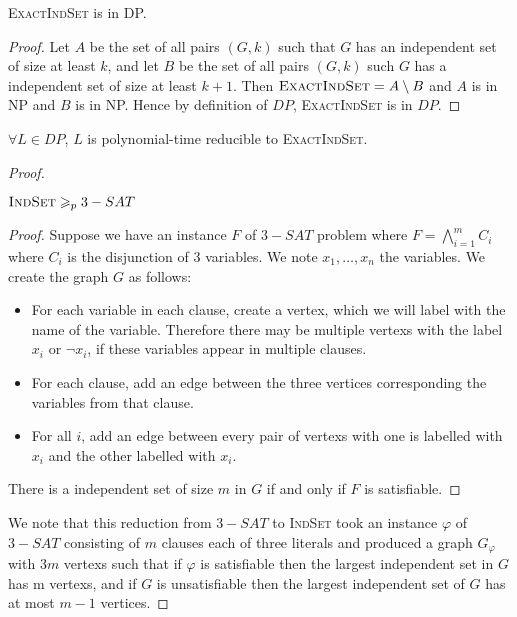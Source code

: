 \begin{propo}\label{3:1}
    \textsc{ExactIndSet} is in DP.
\end{propo}
\begin{proof}
    Let $A$ be the set of all pairs $(G, k)$ such that $G$ has an independent set of size at least $k$, and let $B$ be the set of all pairs $(G, k)$ such $G$ has a independent set of size at least $k+1$. Then $\textsc{ExactIndSet}=A \setminus B$ and $A$ is in NP and $B$ is in NP. Hence by definition of $DP$, \textsc{ExactIndSet} is in $DP$.
\end{proof}

\begin{propo}\label{3:2}
    $\forall L \in DP$, $L$ is polynomial-time reducible to \textsc{ExactIndSet}.
\end{propo}
\begin{proof}
    \begin{lemma}
        $\textsc{IndSet} \geqslant_p 3-SAT$
    \end{lemma}
    \begin{proof}
        Suppose we have an instance $F$ of $3-SAT$ problem where $F=\bigwedge\limits_{i=1}^m C_i$ where $C_i$ is the disjunction of 3 variables. We note $x_1,\ldots,x_n$ the variables. We create the graph $G$ as follows:
        \begin{itemize}
            \item For each variable in each clause, create a vertex, which we will label with the name of the variable. Therefore there may be multiple vertexs with the label $x_i$ or $\neg x_i$, if these variables appear in multiple clauses.
            \item For each clause, add an edge between the three vertices corresponding the variables from that clause.
            \item For all $i$, add an edge between every pair of vertexs with one is labelled with $x_i$ and the other labelled with $x_i$.
        \end{itemize}
        
        There is a independent set of size $m$ in $G$ if and only if $F$ is satisfiable.    
    \end{proof}
    
    We note that this reduction from $3-SAT$ to \textsc{IndSet} took an instance $\varphi$ of $3-SAT$ consisting of $m$ clauses each of three literals and produced a graph $G_\varphi$ with $3 m$ vertexs such that if $\varphi$ is satisfiable then the largest independent set in $G$ has m vertexs, and if $G$ is unsatisfiable then the largest independent set of $G$ has at most $m - 1$ vertices. 
    

\end{proof}
